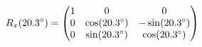 \documentclass[preview]{standalone}
\begin{document}
\begin{align*}
\special{dvisvgm:raw <g id='unique000'>}R_x(20.3^\circ) = \begin{pmatrix} 1 & 0 & 0 \\ 0 & \cos(20.3^\circ) & -\sin(20.3^\circ) \\ 0 & \sin(20.3^\circ) & \cos(20.3^\circ) \end{pmatrix}\special{dvisvgm:raw </g>}
\end{align*}
\end{document}

